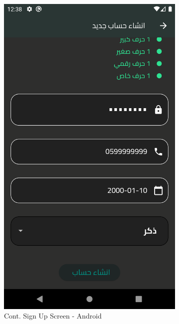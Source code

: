 \documentclass[a4paper, 12pt]{report} %
\begin{document}
\begin{figure}[H]
\begin{subfigure}{0.3\textwidth}
                    \includegraphics[width=0.8\linewidth, height=0.9\textheight, keepaspectratio]{Images/user_sign_up_3.png}
                    \caption{Cont. Sign Up Screen - Android}
                    \label{fig:real_sign_up_3}
                \end{subfigure}
                \begin{subfigure}{0.3\textwidth}

\end{subfigure}
\end{figure}
\end{document}
